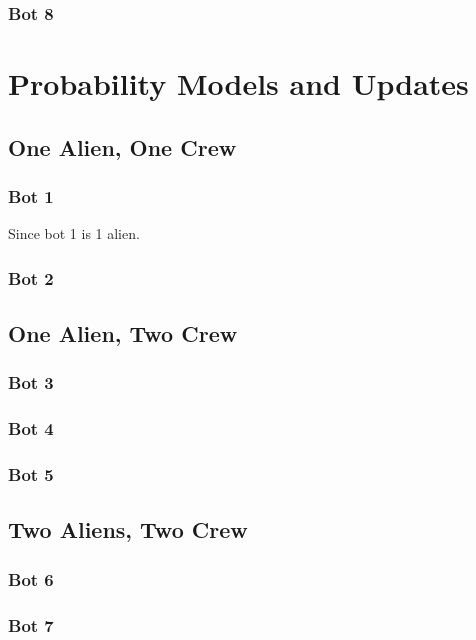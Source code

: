 \documentclass[11pt]{article}
\begin{document}
\subsubsection{Bot 8}



\section{Probability Models and Updates}

\subsection{One Alien, One Crew}

\subsubsection{Bot 1}
Since bot 1 is 1 alien.
\subsubsection{Bot 2}

\subsection{One Alien, Two Crew}

\subsubsection{Bot 3}

\subsubsection{Bot 4}

\subsubsection{Bot 5}

\subsection{Two Aliens, Two Crew}

\subsubsection{Bot 6}

\subsubsection{Bot 7}
\end{document}
